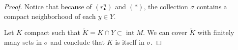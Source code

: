 \documentclass{amsart}
\DeclareMathOperator{\interior}{int}
\begin{document}
\begin{proof}
		Notice that because of $(r_\bullet^n)$ and $(\ast)$, the collection $\sigma$ contains a compact neighborhood of each $y \in Y$.
		
		Let $K$ compact such that $\widetilde K = K \cap Y \subset \interior M$. We can cover $\widetilde{K}$ with finitely many sets in $\sigma$ and conclude that $K$ is itself in $\sigma$.
	\end{proof}
\end{document}
